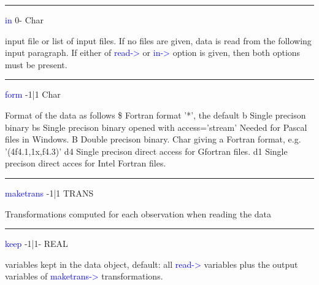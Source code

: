 \hrule
\vspace{0.3cm}
\noindent \textcolor{blue}{in}  \tabto{3cm} 0- \tabto{5cm}  Char \tabto{7cm}
\begin{changemargin}{3cm}{0cm}
\noindent input file or list of input files. If no files are given, data is read from the following input
paragraph. If either of \textcolor{blue}{read->} or \textcolor{blue}{in->} option is given, then both options must
be present.
\end{changemargin}
\vspace{0.3cm}
\hrule
\vspace{0.3cm}
\noindent \textcolor{blue}{form}  \tabto{3cm} -1|1 \tabto{5cm}  Char \tabto{7cm}
\begin{changemargin}{3cm}{0cm}
\noindent  Format of the data as follows \newline
\$  Fortran format '*', the default \newline
b    Single precison binary \newline
bs  Single precison binary opened with access='stream'
Needed for Pascal files in Windows. \newline
B  Double precison binary.\newline
Char giving a Fortran format, e.g. '(4f4.1,1x,f4.3)' \newline
d4 Single precison direct access for Gfortran files.\newline
d1 Single precison direct acces for Intel Fortran files.
\end{changemargin}
\vspace{0.3cm}
\hrule
\vspace{0.3cm}
\noindent \textcolor{blue}{maketrans} \tabto{3cm} -1|1 \tabto{5cm}  TRANS  \tabto{7cm}
\begin{changemargin}{3cm}{0cm}
\noindent Transformations computed for each observation when reading the data


\end{changemargin}
\vspace{0.3cm}
\hrule
\vspace{0.3cm}
\noindent \textcolor{blue}{keep} \tabto{3cm} -1|1- \tabto{5cm}  REAL \tabto{7cm}
\begin{changemargin}{3cm}{0cm}
\noindent  variables kept in the data object, default: all \textcolor{blue}{read->} variables plus the output
variables of \textcolor{blue}{maketrans->} transformations.

\end{changemargin}
\vspace{0.3cm}
